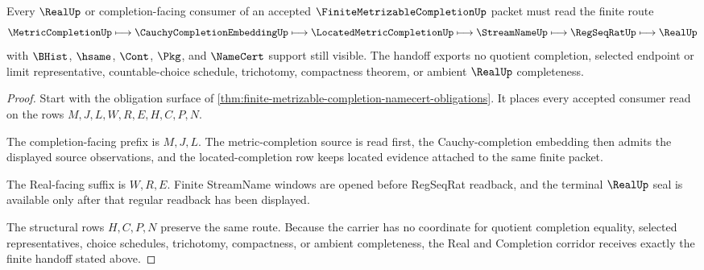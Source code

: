 \begin{theorem}
\label{thm:finite-metrizable-completion-real-handoff}
Every $\RealUp$ or completion-facing consumer of an accepted $\FiniteMetrizableCompletionUp$ packet must read the finite route
$$
\MetricCompletionUp\longmapsto \CauchyCompletionEmbeddingUp\longmapsto \LocatedMetricCompletionUp\longmapsto \StreamNameUp\longmapsto \RegSeqRatUp\longmapsto \RealUp
$$
with $\BHist$, $\hsame$, $\Cont$, $\Pkg$, and $\NameCert$ support still visible. The handoff exports no quotient completion, selected endpoint or limit representative, countable-choice schedule, trichotomy, compactness theorem, or ambient $\RealUp$ completeness.
\end{theorem}
\begin{proof}
Start with the obligation surface of \autoref{thm:finite-metrizable-completion-namecert-obligations}. It places every accepted consumer read on the rows $M,J,L,W,R,E,H,C,P,N$.

The completion-facing prefix is $M,J,L$. The metric-completion source is read first, the Cauchy-completion embedding then admits the displayed source observations, and the located-completion row keeps located evidence attached to the same finite packet.

The Real-facing suffix is $W,R,E$. Finite StreamName windows are opened before RegSeqRat readback, and the terminal $\RealUp$ seal is available only after that regular readback has been displayed.

The structural rows $H,C,P,N$ preserve the same route. Because the carrier has no coordinate for quotient completion equality, selected representatives, choice schedules, trichotomy, compactness, or ambient completeness, the Real and Completion corridor receives exactly the finite handoff stated above.
\end{proof}



